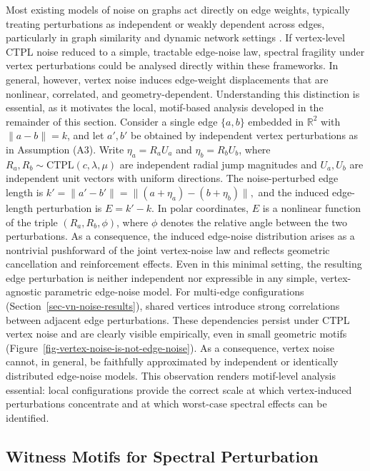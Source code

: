\documentclass[
  11pt,
  letterpaper]{siamart251216}
\begin{document}
Most existing models of noise on graphs act directly on edge weights,
typically treating perturbations as independent or weakly dependent
across edges, particularly in graph similarity and dynamic network
settings \citep{donnat2018tracking, Koutra2016DeltaCon}. If vertex-level
\ac{CTPL} noise reduced to a simple, tractable edge-noise law, spectral
fragility under vertex perturbations could be analysed directly within
these frameworks. In general, however, vertex noise induces edge-weight
displacements that are nonlinear, correlated, and geometry-dependent.
Understanding this distinction is essential, as it motivates the local,
motif-based analysis developed in the remainder of this section.
Consider a single edge \(\{a,b\}\) embedded in \(\mathbb{R}^2\) with
\(\|a-b\| = k\), and let \(a', b'\) be obtained by independent vertex
perturbations as in Assumption (A3). Write \(\eta_a = R_a U_a\) and
\(\eta_b = R_b U_b\), where \(R_a,R_b \sim \text{CTPL}(c,\lambda,\mu)\)
are independent radial jump magnitudes and \(U_a,U_b\) are independent
unit vectors with uniform directions. The noise-perturbed edge length is
\(k' = \|a' - b'\| = \| (a + \eta_a) - (b + \eta_b) \|,\) and the
induced edge-length perturbation is \(E = k' - k\). In polar
coordinates, \(E\) is a nonlinear function of the triple
\((R_a,R_b,\phi)\), where \(\phi\) denotes the relative angle between
the two perturbations. As a consequence, the induced edge-noise
distribution arises as a nontrivial pushforward of the joint
vertex-noise law and reflects geometric cancellation and reinforcement
effects. Even in this minimal setting, the resulting edge perturbation
is neither independent nor expressible in any simple, vertex-agnostic
parametric edge-noise model. For multi-edge configurations
(Section~\ref{sec-vn-noise-results}), shared vertices introduce strong
correlations between adjacent edge perturbations. These dependencies
persist under \ac{CTPL} vertex noise and are clearly visible
empirically, even in small geometric motifs
(Figure~\ref{fig-vertex-noise-is-not-edge-noise}). As a consequence,
vertex noise cannot, in general, be faithfully approximated by
independent or identically distributed edge-noise models. This
observation renders motif-level analysis essential: local configurations
provide the correct scale at which vertex-induced perturbations
concentrate and at which worst-case spectral effects can be identified.

\subsection{Witness Motifs for Spectral
Perturbation}\label{sec-degreeproof}
\end{document}
